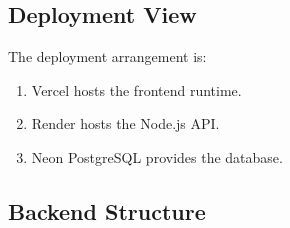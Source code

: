 \documentclass[11pt,a4paper]{article}
\begin{document}
\subsection{Deployment View}

The deployment arrangement is:
\begin{enumerate}[leftmargin=1.5em]
  \item Vercel hosts the frontend runtime.
  \item Render hosts the Node.js API.
  \item Neon PostgreSQL provides the database.
\end{enumerate}

\subsection{Backend Structure}
\end{document}
